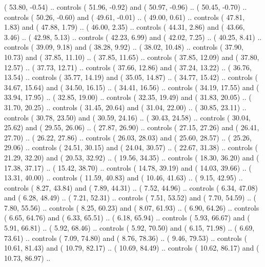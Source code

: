 {        (  53.80,  -0.54) .. controls (  51.96,  -0.92) and (  50.97,  -0.96) ..
        (  50.45,  -0.70) .. controls (  50.26,  -0.60) and (  49.61,  -0.01) ..
        (  49.00,   0.61) .. controls (  47.81,   1.83) and (  47.88,   1.79) ..
        (  46.00,   2.35) .. controls (  44.31,   2.86) and (  43.66,   3.46) ..
        (  42.98,   5.13) .. controls (  42.23,   6.99) and (  42.02,   7.25) ..
        (  40.25,   8.41) .. controls (  39.09,   9.18) and (  38.28,   9.92) ..
        (  38.02,  10.48) .. controls (  37.90,  10.73) and (  37.85,  11.10) ..
        (  37.85,  11.65) .. controls (  37.85,  12.09) and (  37.80,  12.57) ..
        (  37.73,  12.71) .. controls (  37.66,  12.86) and (  37.24,  13.22) ..
        (  36.76,  13.54) .. controls (  35.77,  14.19) and (  35.05,  14.87) ..
        (  34.77,  15.42) .. controls (  34.67,  15.64) and (  34.50,  16.15) ..
        (  34.41,  16.56) .. controls (  34.19,  17.55) and (  33.94,  17.95) ..
        (  32.85,  19.00) .. controls (  32.35,  19.49) and (  31.83,  20.05) ..
        (  31.70,  20.25) .. controls (  31.45,  20.64) and (  31.04,  22.00) ..
        (  30.85,  23.11) .. controls (  30.78,  23.50) and (  30.59,  24.16) ..
        (  30.43,  24.58) .. controls (  30.04,  25.62) and (  29.55,  26.06) ..
        (  27.87,  26.90) .. controls (  27.15,  27.26) and (  26.41,  27.70) ..
        (  26.22,  27.86) .. controls (  26.03,  28.03) and (  25.60,  28.57) ..
        (  25.26,  29.06) .. controls (  24.51,  30.15) and (  24.04,  30.57) ..
        (  22.67,  31.38) .. controls (  21.29,  32.20) and (  20.53,  32.92) ..
        (  19.56,  34.35) .. controls (  18.30,  36.20) and (  17.38,  37.17) ..
        (  15.42,  38.70) .. controls (  14.78,  39.19) and (  14.03,  39.66) ..
        (  13.31,  40.00) .. controls (  11.59,  40.83) and (  10.46,  41.63) ..
        (   9.15,  42.95) .. controls (   8.27,  43.84) and (   7.89,  44.31) ..
        (   7.52,  44.96) .. controls (   6.34,  47.08) and (   6.28,  48.49) ..
        (   7.21,  52.31) .. controls (   7.51,  53.52) and (   7.70,  54.59) ..
        (   7.80,  55.56) .. controls (   8.25,  60.23) and (   8.07,  61.93) ..
        (   6.90,  64.26) .. controls (   6.65,  64.76) and (   6.33,  65.51) ..
        (   6.18,  65.94) .. controls (   5.93,  66.67) and (   5.91,  66.81) ..
        (   5.92,  68.46) .. controls (   5.92,  70.50) and (   6.15,  71.98) ..
        (   6.69,  73.61) .. controls (   7.09,  74.80) and (   8.76,  78.36) ..
        (   9.46,  79.53) .. controls (  10.61,  81.43) and (  10.79,  82.17) ..
        (  10.69,  84.49) .. controls (  10.62,  86.17) and (  10.73,  86.97) ..
}
